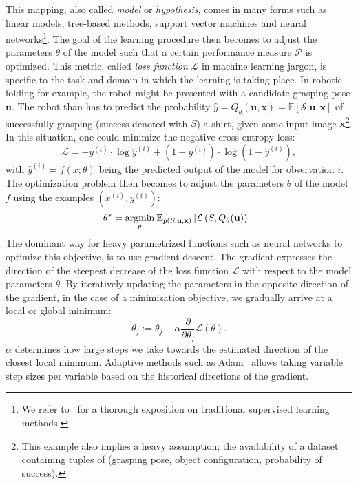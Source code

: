 \documentclass[\home/main.tex]{subfiles}
\begin{document}
This mapping, also called \textit{model} or \textit{hypothesis}, comes in many forms such as linear models, tree-based methods, support vector machines and neural networks\footnote{We refer to~\textcite{Murphy2012, Bishop2006, Hastie2001} for a thorough exposition on traditional supervised learning methods.}.
The goal of the learning procedure then becomes to adjust the parameters $\theta$ of the model such that a certain performance measure $\mathcal{P}$ is optimized. This metric, called \textit{loss function} $\mathcal{L}$ in machine learning jargon, is specific to the task and domain in which the learning is taking place. In robotic folding for example, the robot might be presented with a candidate grasping pose $\mathbf{u}$. The robot than has to predict the probability $\hat{y} = Q_{\theta}(\mathbf{u}, \mathbf{x}) = \mathbb{E}\left[ \mathcal{S} | \mathbf{u}, \mathbf{x} \right]$ of successfully grasping (success denoted with $S$) a shirt, given some input image $\mathbf{x}$\footnote{This example also implies a heavy assumption; the availability of a dataset containing tuples of (grasping pose, object configuration, probability of success).}.
In this situation, one could minimize the negative cross-entropy loss:
\begin{equation*}
	\mathcal{L}=-y^{(i)} \cdot \log \hat{y}^{(i)} +\left(1-y^{(i)}\right) \cdot \log \left(1-\hat{y}^{(i)}\right),
\end{equation*} with $\hat{y}^{(i)} = f(x;\theta)$ being the predicted output of the model for observation $i$.
The optimization problem then becomes to adjust the parameters $\theta$ of the model $f$ using the examples $\left(x^{(i)}, y^{(i)}\right)$:
\begin{equation*}
	\theta^{*}=\underset{\theta}{\operatorname*{argmin}} \: \mathbb{E}_{p(S, \mathbf{u}, \mathbf{x})}\left[\mathcal{L}\left(S, Q_{\theta}(\mathbf{u})\right)\right].
\end{equation*} 
The dominant way for heavy parametrized functions such as neural networks to optimize this objective, is to use gradient descent. The gradient expresses the direction of the steepest decrease of the loss function $\mathcal{L}$ with respect to the model parameters $\theta$. By iteratively updating the parameters in the opposite direction of the gradient, in the case of a minimization objective, we gradually arrive at a local or global minimum:
\begin{equation*}
	\theta_{j}:=\theta_{j}-\alpha \frac{\partial}{\partial \theta_{j}} \mathcal{L}(\theta).
\end{equation*}
$\alpha$ determines how large steps we take towards the estimated direction of the closest local minimum. Adaptive methods such as Adam~\autocite{Kingma2014} allows taking variable step sizes per variable based on the historical directions of the gradient. 
\end{document}
